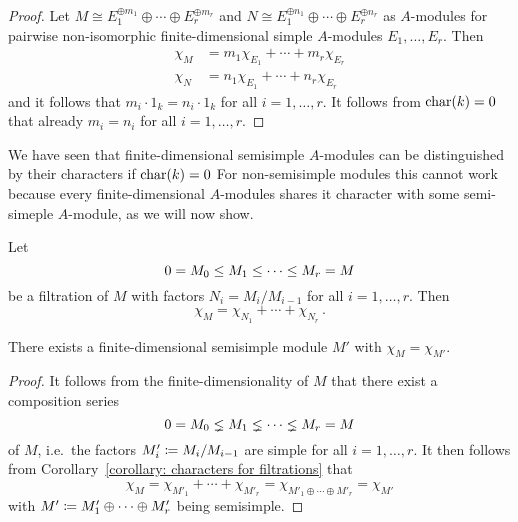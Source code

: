 \begin{proof}
  Let $M \cong E_1^{\oplus m_1} \oplus \dotsb \oplus E_r^{\oplus m_r}$ and $N \cong E_1^{\oplus n_1} \oplus \dotsb \oplus E_r^{\oplus n_r}$ as $A$-modules for pairwise non-isomorphic finite-dimensional simple $A$-modules $E_1, \dotsc, E_r$.
  Then
  \begin{align*}
    \chi_M &= m_1 \chi_{E_1} + \dotsb + m_r \chi_{E_r}  \\
    \chi_N &= n_1 \chi_{E_1} + \dotsb + n_r \chi_{E_r}
  \end{align*}
  and it follows that $m_i \cdot 1_k = n_i \cdot 1_k$ for all $i = 1, \dotsc, r$.
  It follows from $\operatorname{char}(k) = 0$ that already $m_i = n_i$ for all $i = 1, \dotsc, r$.
\end{proof}


\begin{fluff}
  We have seen that finite-dimensional semisimple $A$-modules can be distinguished by their characters if $\operatorname{char}(k) = 0$
  For non-semisimple modules this cannot work because every finite-dimensional $A$-modules shares it character with some semi-simeple $A$-module, as we will now show.
\end{fluff}


\begin{corollary}
  \label{corollary: characters for filtrations}
  Let
  \[
                0
    =           M_0
    \leq  M_1
    \leq  \dotsb
    \leq  M_r
    =           M
  \]
  be a filtration of $M$ with factors $N_i = M_i/M_{i-1}$ for all $i = 1, \dotsc, r$.
  Then
  \[
      \chi_M
    = \chi_{N_1} + \dotsb + \chi_{N_r} \,.
  \]
\end{corollary}




\begin{corollary}
  There exists a finite-dimensional semisimple module $M'$ with $\chi_M = \chi_{M'}$.
\end{corollary}


\begin{proof}
  It follows from the finite-dimensionality of $M$ that there exist a composition series
  \[
                  0
    =             M_0
    \lneq   M_1
    \lneq   \dotsb
    \lneq   M_r
    =             M
  \]
  of $M$, i.e.\ the factors $M'_i \coloneqq M_i/M_{i-1}$ are simple for all $i = 1, \dotsc, r$.
  It then follows from Corollary~\ref{corollary: characters for filtrations} that
  \[
      \chi_M
    = \chi_{M'_1} + \dotsb + \chi_{M'_r}
    = \chi_{M'_1 \oplus \dotsb \oplus M'_r}
    = \chi_{M'}
  \]
  with $M' \coloneqq M'_1 \oplus \dotsb \oplus M'_r$ being semisimple.
\end{proof}





